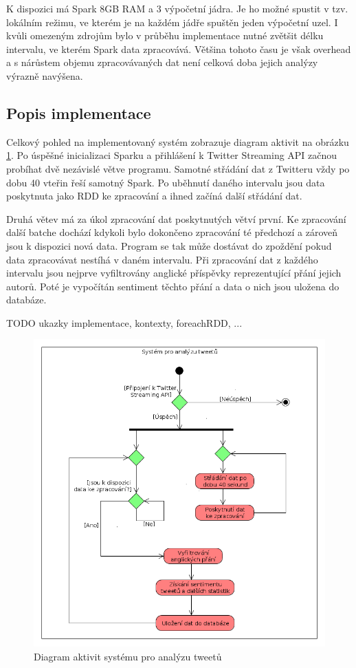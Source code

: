 \documentclass[thesis=B,czech]{FITthesis}[2012/06/26]
\begin{document}
K dispozici má Spark 8GB RAM a 3 výpočetní jádra. Je ho možné spustit v tzv. lokálním režimu, ve kterém je na každém jádře spuštěn jeden výpočetní uzel. I kvůli omezeným zdrojům bylo v průběhu implementace nutné zvětšit délku intervalu, ve kterém Spark data zpracovává. Většina tohoto času je však overhead a s nárůstem objemu zpracovávaných dat není celková doba jejich analýzy výrazně navýšena. 

\subsection{Popis implementace}

Celkový pohled na implementovaný systém zobrazuje diagram aktivit na obrázku \ref{fig:activity_diagram}. Po úspěšné inicializaci Sparku a přihlášení k Twitter Streaming API začnou probíhat dvě nezávislé větve programu. Samotné střádání dat z Twitteru vždy po dobu 40 vteřin řeší samotný Spark. Po uběhnutí daného intervalu jsou data poskytnuta jako RDD ke zpracování a ihned začíná další střádání dat. 

Druhá větev má za úkol zpracování dat poskytnutých větví první. Ke zpracování další batche dochází kdykoli bylo dokončeno zpracování té předchozí a zároveň jsou k dispozici nová data. Program se tak může dostávat do zpoždění pokud data zpracovávat nestíhá v daném intervalu. Při zpracování dat z každého intervalu jsou nejprve vyfiltrovány anglické příspěvky reprezentující přání jejich autorů. Poté je vypočítán sentiment těchto přání a data o nich jsou uložena do databáze. 

TODO ukazky implementace, kontexty, foreachRDD, ...
	
\begin{figure}[h]
   	\centering
   	\includegraphics[width=1\textwidth]{images/activity-diagram.png}
   	\caption{Diagram aktivit systému pro analýzu tweetů}
   	\label{fig:activity_diagram}
\end{figure}
\end{document}
